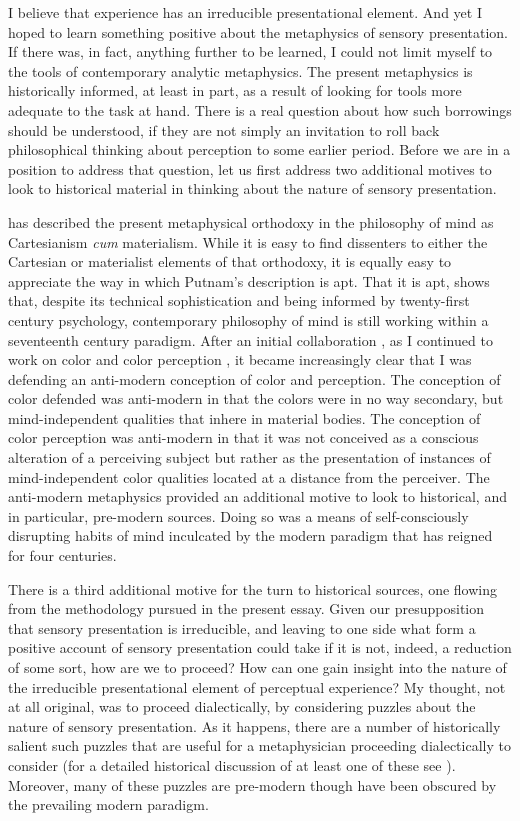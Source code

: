 I believe that experience has an irreducible presentational element. And yet I hoped to learn something positive about the metaphysics of sensory presentation. If there was, in fact, anything further to be learned, I could not limit myself to the tools of contemporary analytic metaphysics. The present metaphysics is historically informed, at least in part, as a result of looking for tools more adequate to the task at hand. There is a real question about how such borrowings should be understood, if they are not simply an invitation to roll back philosophical thinking about perception to some earlier period. Before we are in a position to address that question, let us first address two additional motives to look to historical material in thinking about the nature of sensory presentation.

\citet{Putnam:1993kx,Putnam:1994kx,Putnam:1999eu} has described the present metaphysical orthodoxy in the philosophy of mind as Cartesianism \emph{cum} materialism. While it is easy to find dissenters to either the Cartesian or materialist elements of that orthodoxy, it is equally easy to appreciate the way in which Putnam's description is apt. That it is apt, shows that, despite its technical sophistication and being informed by twenty-first century psychology, contemporary philosophy of mind is still working within a seventeenth century paradigm. After an initial collaboration \citep{Hilbert:2000on}, as I continued to work on color and color perception \citep{Kalderon:2006tg,Kalderon:2008fk,Kalderon:2007mr,Kalderon:2010fj,Kalderon:2011fk}, it became increasingly clear that I was defending an anti-modern conception of color and perception. The conception of color defended was anti-modern in that the colors were in no way secondary, but mind-independent qualities that inhere in material bodies. The conception of color perception was anti-modern in that it was not conceived as a conscious alteration of a perceiving subject but rather as the presentation of instances of mind-independent color qualities located at a distance from the perceiver. The anti-modern metaphysics provided an additional motive to look to historical, and in particular, pre-modern sources. Doing so was a means of self-consciously disrupting habits of mind inculcated by the modern paradigm that has reigned for four centuries. 

There is a third additional motive for the turn to historical sources, one flowing from the methodology pursued in the present essay. Given our presupposition that sensory presentation is irreducible, and leaving to one side what form a positive account of sensory presentation could take if it is not, indeed, a reduction of some sort, how are we to proceed? How can one gain insight into the nature of the irreducible presentational element of perceptual experience? My thought, not at all original, was to proceed dialectically, by considering puzzles about the nature of sensory presentation. As it happens, there are a number of historically salient such puzzles that are useful for a metaphysician proceeding dialectically to consider (for a detailed historical discussion of at least one of these see \citealt{Kalderon:2015fr}). Moreover, many of these puzzles are pre-modern though have been obscured by the prevailing modern paradigm.

